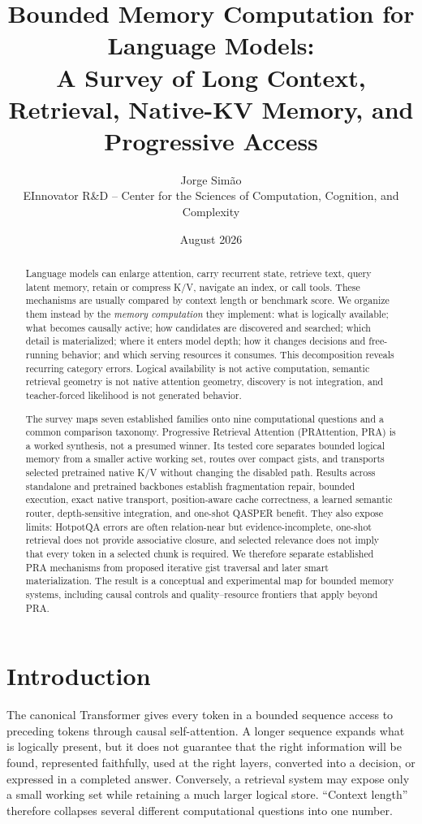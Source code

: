 \documentclass[10pt,a4paper]{article}
\title{\textbf{Bounded Memory Computation for Language Models:}\\A Survey of Long Context, Retrieval, Native-KV Memory, and Progressive Access}
\author{Jorge Sim\~ao\\EInnovator R\&D -- Center for the Sciences of Computation, Cognition, and Complexity}
\date{August 2026}
\begin{document}
\maketitle
\begin{abstract}
Language models can enlarge attention, carry recurrent state, retrieve text, query latent
memory, retain or compress K/V, navigate an index, or call tools. These mechanisms are
usually compared by context length or benchmark score. We organize them instead by the
\emph{memory computation} they implement: what is logically available; what becomes causally
active; how candidates are discovered and searched; which detail is materialized; where it
enters model depth; how it changes decisions and free-running behavior; and which serving
resources it consumes. This decomposition reveals recurring category errors. Logical
availability is not active computation, semantic retrieval geometry is not native attention
geometry, discovery is not integration, and teacher-forced likelihood is not generated
behavior.

The survey maps seven established families onto nine computational questions and a common
comparison taxonomy. Progressive Retrieval Attention (PRAttention, PRA) is a worked synthesis,
not a presumed winner. Its tested core separates bounded logical memory from a smaller active
working set, routes over compact gists, and transports selected pretrained native K/V without
changing the disabled path. Results across standalone and pretrained backbones establish
fragmentation repair, bounded execution, exact native transport, position-aware cache
correctness, a learned semantic router, depth-sensitive integration, and one-shot QASPER
benefit. They also expose limits: HotpotQA errors are often relation-near but evidence-incomplete,
one-shot retrieval does not provide associative closure, and selected relevance does not imply
that every token in a selected chunk is required. We therefore separate established PRA
mechanisms from proposed iterative gist traversal and later smart materialization. The result
is a conceptual and experimental map for bounded memory systems, including causal controls and
quality--resource frontiers that apply beyond PRA.
\end{abstract}
\tableofcontents
\newpage

\section{Introduction}
The canonical Transformer gives every token in a bounded sequence access to preceding
tokens through causal self-attention. A longer sequence expands what is logically present,
but it does not guarantee that the right information will be found, represented faithfully,
used at the right layers, converted into a decision, or expressed in a completed answer.
Conversely, a retrieval system may expose only a small working set while retaining a much
larger logical store. ``Context length'' therefore collapses several different computational
questions into one number.
\end{document}
